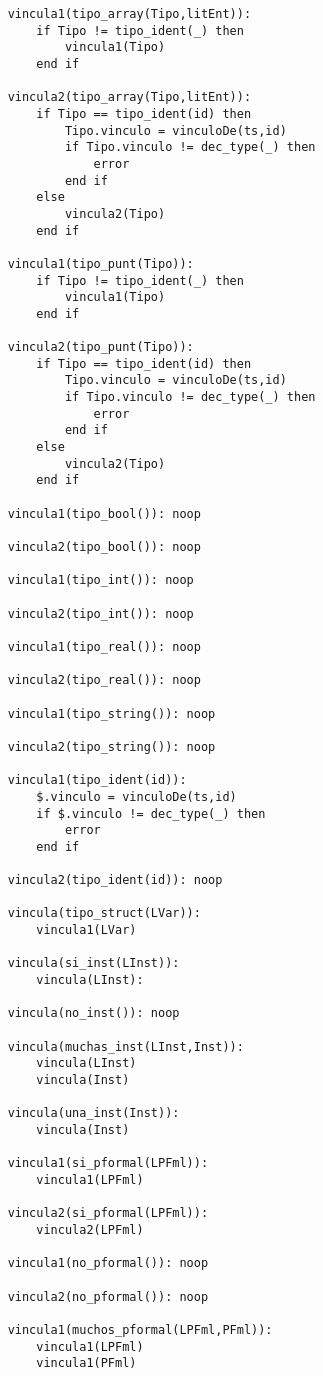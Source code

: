 \begin{lstlisting}
    vincula1(tipo_array(Tipo,litEnt)):
        if Tipo != tipo_ident(_) then
            vincula1(Tipo)
        end if

    vincula2(tipo_array(Tipo,litEnt)):
        if Tipo == tipo_ident(id) then
            Tipo.vinculo = vinculoDe(ts,id)
            if Tipo.vinculo != dec_type(_) then
                error
            end if
        else
            vincula2(Tipo)
        end if

    vincula1(tipo_punt(Tipo)):
        if Tipo != tipo_ident(_) then
            vincula1(Tipo)
        end if

    vincula2(tipo_punt(Tipo)):
        if Tipo == tipo_ident(id) then
            Tipo.vinculo = vinculoDe(ts,id)
            if Tipo.vinculo != dec_type(_) then
                error
            end if
        else
            vincula2(Tipo)
        end if

    vincula1(tipo_bool()): noop

    vincula2(tipo_bool()): noop

    vincula1(tipo_int()): noop

    vincula2(tipo_int()): noop

    vincula1(tipo_real()): noop

    vincula2(tipo_real()): noop

    vincula1(tipo_string()): noop

    vincula2(tipo_string()): noop

    vincula1(tipo_ident(id)):
        $.vinculo = vinculoDe(ts,id)
        if $.vinculo != dec_type(_) then
            error
        end if

    vincula2(tipo_ident(id)): noop

    vincula(tipo_struct(LVar)):
        vincula1(LVar)

    vincula(si_inst(LInst)):
        vincula(LInst):

    vincula(no_inst()): noop

    vincula(muchas_inst(LInst,Inst)):
        vincula(LInst)
        vincula(Inst)

    vincula(una_inst(Inst)):
        vincula(Inst)

    vincula1(si_pformal(LPFml)):
        vincula1(LPFml)

    vincula2(si_pformal(LPFml)):
        vincula2(LPFml)

    vincula1(no_pformal()): noop

    vincula2(no_pformal()): noop

    vincula1(muchos_pformal(LPFml,PFml)):
        vincula1(LPFml)
        vincula1(PFml)


\end{lstlisting}
